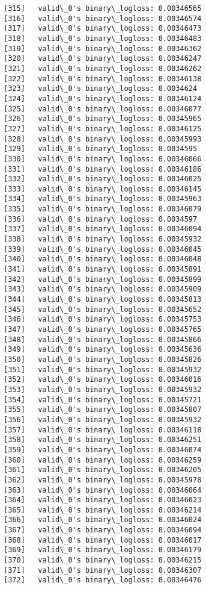 \documentclass[11pt]{article}
\begin{document}
\begin{Verbatim}[commandchars=\\\{\}]
[315]	valid\_0's binary\_logloss: 0.00346565
[316]	valid\_0's binary\_logloss: 0.00346574
[317]	valid\_0's binary\_logloss: 0.00346473
[318]	valid\_0's binary\_logloss: 0.00346483
[319]	valid\_0's binary\_logloss: 0.00346362
[320]	valid\_0's binary\_logloss: 0.00346247
[321]	valid\_0's binary\_logloss: 0.00346262
[322]	valid\_0's binary\_logloss: 0.00346138
[323]	valid\_0's binary\_logloss: 0.0034624
[324]	valid\_0's binary\_logloss: 0.00346124
[325]	valid\_0's binary\_logloss: 0.00346077
[326]	valid\_0's binary\_logloss: 0.00345965
[327]	valid\_0's binary\_logloss: 0.00346125
[328]	valid\_0's binary\_logloss: 0.00345993
[329]	valid\_0's binary\_logloss: 0.0034595
[330]	valid\_0's binary\_logloss: 0.00346066
[331]	valid\_0's binary\_logloss: 0.00346186
[332]	valid\_0's binary\_logloss: 0.00346025
[333]	valid\_0's binary\_logloss: 0.00346145
[334]	valid\_0's binary\_logloss: 0.00345963
[335]	valid\_0's binary\_logloss: 0.00346079
[336]	valid\_0's binary\_logloss: 0.0034597
[337]	valid\_0's binary\_logloss: 0.00346094
[338]	valid\_0's binary\_logloss: 0.00345932
[339]	valid\_0's binary\_logloss: 0.00346045
[340]	valid\_0's binary\_logloss: 0.00346048
[341]	valid\_0's binary\_logloss: 0.00345891
[342]	valid\_0's binary\_logloss: 0.00345899
[343]	valid\_0's binary\_logloss: 0.00345909
[344]	valid\_0's binary\_logloss: 0.00345813
[345]	valid\_0's binary\_logloss: 0.00345652
[346]	valid\_0's binary\_logloss: 0.00345753
[347]	valid\_0's binary\_logloss: 0.00345765
[348]	valid\_0's binary\_logloss: 0.00345866
[349]	valid\_0's binary\_logloss: 0.00345636
[350]	valid\_0's binary\_logloss: 0.00345826
[351]	valid\_0's binary\_logloss: 0.00345932
[352]	valid\_0's binary\_logloss: 0.00346016
[353]	valid\_0's binary\_logloss: 0.00345932
[354]	valid\_0's binary\_logloss: 0.00345721
[355]	valid\_0's binary\_logloss: 0.00345807
[356]	valid\_0's binary\_logloss: 0.00345932
[357]	valid\_0's binary\_logloss: 0.00346118
[358]	valid\_0's binary\_logloss: 0.00346251
[359]	valid\_0's binary\_logloss: 0.00346074
[360]	valid\_0's binary\_logloss: 0.00346259
[361]	valid\_0's binary\_logloss: 0.00346205
[362]	valid\_0's binary\_logloss: 0.00345978
[363]	valid\_0's binary\_logloss: 0.00346064
[364]	valid\_0's binary\_logloss: 0.00346023
[365]	valid\_0's binary\_logloss: 0.00346214
[366]	valid\_0's binary\_logloss: 0.00346024
[367]	valid\_0's binary\_logloss: 0.00346094
[368]	valid\_0's binary\_logloss: 0.00346017
[369]	valid\_0's binary\_logloss: 0.00346179
[370]	valid\_0's binary\_logloss: 0.00346215
[371]	valid\_0's binary\_logloss: 0.00346307
[372]	valid\_0's binary\_logloss: 0.00346476

\end{Verbatim}
\end{document}

